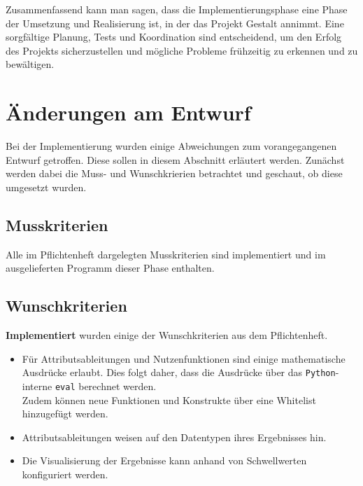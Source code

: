 \documentclass{article}
\begin{document}
Zusammenfassend kann man sagen, dass die Implementierungsphase eine Phase der Umsetzung und Realisierung ist, in der das Projekt Gestalt annimmt. Eine sorgfältige Planung, Tests und Koordination sind entscheidend, um den Erfolg des Projekts sicherzustellen und mögliche Probleme frühzeitig zu erkennen und zu bewältigen.


\newpage
\section{Änderungen am Entwurf}

Bei der Implementierung wurden einige Abweichungen zum vorangegangenen Entwurf getroffen. Diese sollen in diesem Abschnitt erläutert werden. Zunächst werden dabei die Muss- und Wunschkrierien betrachtet und geschaut, ob diese umgesetzt wurden.

\subsection{Musskriterien}
Alle im Pflichtenheft dargelegten Musskriterien sind implementiert und im ausgelieferten Programm dieser Phase enthalten. \\

\subsection{Wunschkriterien}
\textbf{Implementiert} wurden einige der Wunschkriterien aus dem Pflichtenheft. 
\begin{itemize}
    \item Für Attributsableitungen und Nutzenfunktionen sind einige mathematische Ausdrücke erlaubt. Dies folgt daher, dass die Ausdrücke über das \texttt{Python}-interne \texttt{eval} berechnet werden. \\
    Zudem können neue Funktionen und Konstrukte über eine Whitelist hinzugefügt werden.
    \item Attributsableitungen weisen auf den Datentypen ihres Ergebnisses hin.
    \item Die Visualisierung der Ergebnisse kann anhand von Schwellwerten konfiguriert werden.
\end{itemize}
\end{document}
